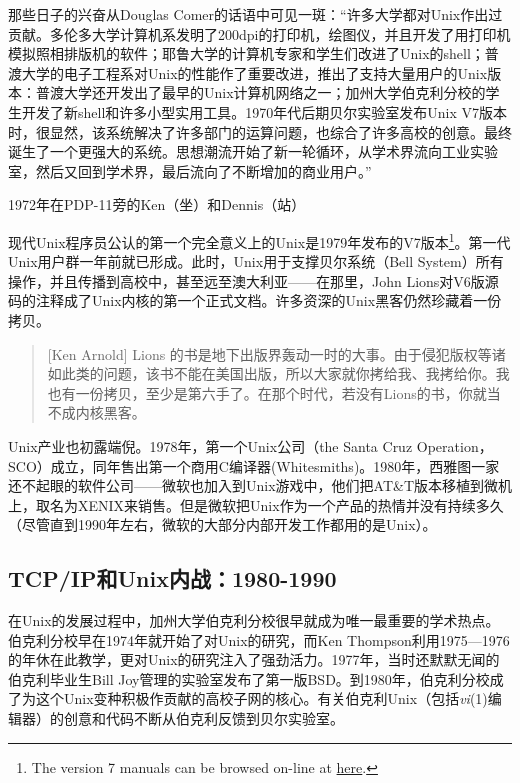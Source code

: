 \documentclass[12pt,oneside]{book}
\begin{document}
\begin{common-format}
那些日子的兴奋从Douglas Comer的话语中可见一斑：“许多大学都对Unix作出过贡献。多伦多大学计算机系发明了200dpi的打印机，绘图仪，并且开发了用打印机模拟照相排版机的软件；耶鲁大学的计算机专家和学生们改进了Unix的shell；普渡大学的电子工程系对Unix的性能作了重要改进，推出了支持大量用户的Unix版本：普渡大学还开发出了最早的Unix计算机网络之一；加州大学伯克利分校的学生开发了新shell和许多小型实用工具。1970年代后期贝尔实验室发布Unix V7版本时，很显然，该系统解决了许多部门的运算问题，也综合了许多高校的创意。最终诞生了一个更强大的系统。思想潮流开始了新一轮循环，从学术界流向工业实验室，然后又回到学术界，最后流向了不断增加的商业用户。”\cite{Comer}
\begin{fig}[7]{1972年在PDP-11旁的Ken（坐）和Dennis（站）}
\label{fig:1972年在PDP-11旁的Ken（坐）和Dennis（站）}
\end{fig}

现代Unix程序员公认的第一个完全意义上的Unix是1979年发布的V7版本\footnote{The version 7 manuals can be browsed on-line at \href{http://plan9.bell-labs.com/7thEdMan/index.html}{here}.}。第一代Unix用户群一年前就已形成。此时，Unix用于支撑贝尔系统（Bell System）所有操作\cite{Hauben}，并且传播到高校中，甚至远至澳大利亚——在那里，John Lions对V6版源码的注释\cite{Lions}成了Unix内核的第一个正式文档。许多资深的Unix黑客仍然珍藏着一份拷贝。

\begin{quote}[Ken Arnold]
Lions 的书是地下出版界轰动一时的大事。由于侵犯版权等诸如此类的问题，该书不能在美国出版，所以大家就你拷给我、我拷给你。我也有一份拷贝，至少是第六手了。在那个时代，若没有Lions的书，你就当不成内核黑客。
\end{quote}

Unix产业也初露端倪。1978年，第一个Unix公司（the Santa Cruz Operation，SCO）成立，同年售出第一个商用C编译器(Whitesmiths)。1980年，西雅图一家还不起眼的软件公司——微软也加入到Unix游戏中，他们把AT\&{}T版本移植到微机上，取名为XENIX来销售。但是微软把Unix作为一个产品的热情并没有持续多久（尽管直到1990年左右，微软的大部分内部开发工作都用的是Unix）。

\subsection{TCP/IP和Unix内战：1980-1990}
在Unix的发展过程中，加州大学伯克利分校很早就成为唯一最重要的学术热点。伯克利分校早在1974年就开始了对Unix的研究，而Ken Thompson利用1975—1976的年休在此教学，更对Unix的研究注入了强劲活力。1977年，当时还默默无闻的伯克利毕业生Bill Joy管理的实验室发布了第一版BSD。到1980年，伯克利分校成了为这个Unix变种积极作贡献的高校子网的核心。有关伯克利Unix（包括\textit{vi}(1)编辑器）的创意和代码不断从伯克利反馈到贝尔实验室。


\end{common-format}
\end{document}
